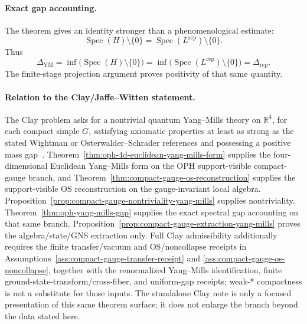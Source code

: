 \paragraph{Exact gap accounting.}
The theorem gives an identity stronger than a phenomenological estimate:
\[
\operatorname{Spec}(H)\setminus\{0\}
=
\operatorname{Spec}(L^{\mathrm{rep}})\setminus\{0\}.
\]
Thus
\[
\Delta_{\mathrm{YM}}
=
\inf\bigl(\operatorname{Spec}(H)\setminus\{0\}\bigr)
=
\inf\bigl(\operatorname{Spec}(L^{\mathrm{rep}})\setminus\{0\}\bigr)
=
\Delta_{\mathrm{rep}}.
\]
The finite-stage projection argument proves positivity of that same quantity.

\paragraph{Relation to the Clay/Jaffe--Witten statement.}
The Clay problem asks for a nontrivial quantum Yang--Mills theory on \(\mathbb R^4\), for each
compact simple \(G\), satisfying axiomatic properties at least as strong as the stated Wightman or
Osterwalder--Schrader references and possessing a positive mass gap~\cite{jaffeWittenYM,clayYM}.
Theorem~\ref{thm:oph-4d-euclidean-yang-mills-form} supplies the four-dimensional Euclidean
Yang--Mills form on the OPH support-visible compact-gauge branch, and
Theorem~\ref{thm:compact-gauge-os-reconstruction} supplies the support-visible OS reconstruction
on the gauge-invariant local algebra. Proposition~\ref{prop:compact-gauge-nontriviality-yang-mills}
supplies nontriviality. 
Theorem~\ref{thm:oph-yang-mills-gap} supplies the exact spectral gap accounting on that same
branch. Proposition~\ref{prop:compact-gauge-extraction-yang-mills} proves the algebra/state/GNS
extraction only. Full Clay admissibility additionally requires the finite transfer/vacuum and
OS/noncollapse receipts in Assumptions~\ref{ass:compact-gauge-transfer-receipt} and
\ref{ass:compact-gauge-os-noncollapse}, together with the renormalized Yang--Mills identification,
finite ground-state-transform/cross-fiber, and uniform-gap receipts; weak-* compactness is not a
substitute for those inputs.
The standalone Clay note is only a focused presentation of this same theorem surface; it does not
enlarge the branch beyond the data stated here.
